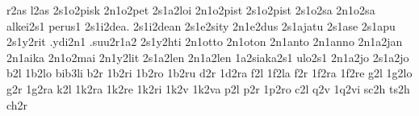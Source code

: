 {r2as l2as   %
2s1o2pisk   %
2n1o2pet
2s1a2loi
2n1o2pist    %
2s1o2pist
2s1o2sa      %
2n1o2sa      %
alkei2s1
perus1
2s1i2dea. 2s1i2dean
2s1e2sity    %
2n1e2dus     %
2s1ajatu     %
2s1ase
2s1apu
2s1y2rit     %
.ydi2n1
.suu2r1a2    %
2s1y2hti
2n1otto 2n1oton
2n1anto 2n1anno
2n1a2jan 2n1aika
2n1o2mai
2n1y2lit
2s1a2len
2n1a2len
1a2siaka2s1
ulo2s1        %
2n1a2jo       %
2s1a2jo
%
%
%
b2l 1b2lo bib3li
b2r 1b2ri 1b2ro 1b2ru
d2r 1d2ra
f2l 1f2la
f2r 1f2ra 1f2re
g2l 1g2lo
g2r 1g2ra
k2l
1k2ra 1k2re 1k2ri
1k2v 1k2va
p2l
p2r 1p2ro
c2l
q2v 1q2vi
sc2h ts2h
ch2r
}
